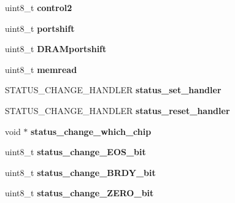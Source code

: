 \begin{DoxyCompactItemize}
\item 
\hypertarget{structYM__DELTAT_ad52ce845bfe38b39be4cf65514177a62}{uint8\-\_\-t {\bfseries control2}}\label{structYM__DELTAT_ad52ce845bfe38b39be4cf65514177a62}

\item 
\hypertarget{structYM__DELTAT_aaf5058a0c5ffc68df5d6883cec0cc20b}{uint8\-\_\-t {\bfseries portshift}}\label{structYM__DELTAT_aaf5058a0c5ffc68df5d6883cec0cc20b}

\item 
\hypertarget{structYM__DELTAT_ade85234a18ceec57cbba09600f3adafc}{uint8\-\_\-t {\bfseries D\-R\-A\-Mportshift}}\label{structYM__DELTAT_ade85234a18ceec57cbba09600f3adafc}

\item 
\hypertarget{structYM__DELTAT_a712141e1a4e471e77fbe16298993b25f}{uint8\-\_\-t {\bfseries memread}}\label{structYM__DELTAT_a712141e1a4e471e77fbe16298993b25f}

\item 
\hypertarget{structYM__DELTAT_a6d2b781b7706d1b152c94a1497e402f1}{S\-T\-A\-T\-U\-S\-\_\-\-C\-H\-A\-N\-G\-E\-\_\-\-H\-A\-N\-D\-L\-E\-R {\bfseries status\-\_\-set\-\_\-handler}}\label{structYM__DELTAT_a6d2b781b7706d1b152c94a1497e402f1}

\item 
\hypertarget{structYM__DELTAT_a746551932689550900a8ce5ebb4a40f7}{S\-T\-A\-T\-U\-S\-\_\-\-C\-H\-A\-N\-G\-E\-\_\-\-H\-A\-N\-D\-L\-E\-R {\bfseries status\-\_\-reset\-\_\-handler}}\label{structYM__DELTAT_a746551932689550900a8ce5ebb4a40f7}

\item 
\hypertarget{structYM__DELTAT_aa1b7a874de4b081c7107129450e71ed3}{void $\ast$ {\bfseries status\-\_\-change\-\_\-which\-\_\-chip}}\label{structYM__DELTAT_aa1b7a874de4b081c7107129450e71ed3}

\item 
\hypertarget{structYM__DELTAT_a574c22041b12145bc35029126432f52d}{uint8\-\_\-t {\bfseries status\-\_\-change\-\_\-\-E\-O\-S\-\_\-bit}}\label{structYM__DELTAT_a574c22041b12145bc35029126432f52d}

\item 
\hypertarget{structYM__DELTAT_ac8ecdb75a9ccf14fa61579f2499308f4}{uint8\-\_\-t {\bfseries status\-\_\-change\-\_\-\-B\-R\-D\-Y\-\_\-bit}}\label{structYM__DELTAT_ac8ecdb75a9ccf14fa61579f2499308f4}

\item 
\hypertarget{structYM__DELTAT_a48495a2912028ad81da78416f313315e}{uint8\-\_\-t {\bfseries status\-\_\-change\-\_\-\-Z\-E\-R\-O\-\_\-bit}}\label{structYM__DELTAT_a48495a2912028ad81da78416f313315e}


\end{DoxyCompactItemize}
